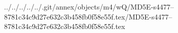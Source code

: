 ../../../../../.git/annex/objects/m4/wQ/MD5E-s4477--8781c34c9d27e632c3b458fb0f58e55f.tex/MD5E-s4477--8781c34c9d27e632c3b458fb0f58e55f.tex